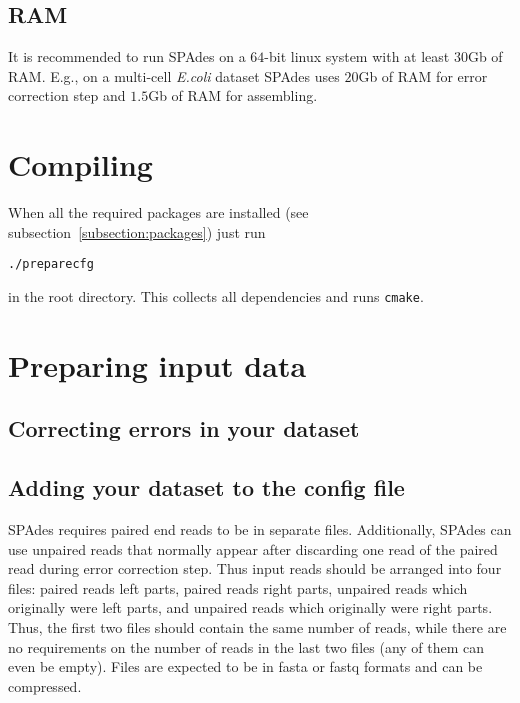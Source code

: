 \documentclass{article}
\def\spades{SPAdes}
\begin{document}
\subsection{RAM}
It is recommended to run {\spades} on a $64$-bit linux system with at least $30$Gb of RAM.
E.g., on a multi-cell {\it E.coli} dataset {\spades} uses $20$Gb of RAM for error correction step
and $1.5$Gb of RAM for assembling.{}

\section{Compiling}
When all the required packages are installed (see 
subsection~\ref{subsection:packages})
just run
\begin{lstlisting}
./preparecfg
\end{lstlisting}
in the root directory. 
This collects all dependencies and runs {\tt cmake}.

\section{Preparing input data}
\subsection{Correcting errors in your dataset}

\subsection{Adding your dataset to the config file}\label{subsec:datasets}
{\spades} requires paired end reads to be in separate files.
Additionally, {\spades} can use unpaired reads that normally appear after discarding one read of the paired read during error correction step.
Thus input reads should be arranged into four files: paired reads left parts, paired reads right parts, unpaired reads which originally were left parts, and
unpaired reads which originally were right parts. Thus, the first two files should contain the same number of reads, while
there are no requirements on the number of reads in the last two files (any of them can even be empty).
Files are expected to be in fasta or fastq formats and can be compressed.
\end{document}
